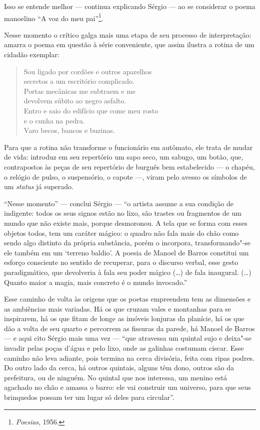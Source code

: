 Isso se entende melhor --- continua explicando Sérgio --- ao se considerar
o poema manoelino ``A voz do meu pai''\footnote{\emph{Poesias}, 1956.}.

Nesse momento o crítico galga mais uma etapa de seu processo de
interpretação: amarra o poema em questão à série conveniente, que assim
ilustra a rotina de um cidadão exemplar:

\begin{verse}
Sou ligado por cordões e outros aparelhos \\
secretos a um escritório complicado. \\[5pt]
Portas mecânicas me subtraem e me \\
devolvem súbito ao negro asfalto. \\[5pt]
Entro e saio do edifício que come meu rosto \\
e o cunha na pedra. \\[5pt]
Varo becos, bancos e buzinas.
\end{verse}

Para que a rotina não transforme o funcionário em autômato, ele trata de
mudar de vida: introduz em seu repertório um sapo seco, um sabugo, um
botão, que, contrapostos às peças de seu repertório de burguês bem
estabelecido --- o chapéu, o relógio de pulso, o suspensório, o capote
---, viram pelo avesso os símbolos de um \emph{status} já superado.

``Nesse momento'' --- conclui Sérgio --- ``o artista assume a sua condição
de indigente: todos os seus signos estão no lixo, são trastes ou
fragmentos de um mundo que não existe mais, porque desmoronou. A tela
que se forma com esses objetos todos, tem um caráter mágico: o quadro
não fala mais do chão como sendo algo distinto da própria substância,
porém o incorpora, transformando"-se ele também em um `terreno baldio'.
A poesia de Manoel de Barros constitui um esforço consciente no sentido
de recuperar, para o discurso verbal, esse gesto paradigmático, que
devolveria à fala seu poder mágico (\ldots{}) de fala inaugural. (\ldots{}) Quanto
maior a magia, mais concreto é o mundo invocado.''

Esse caminho de volta às origens que os poetas empreendem tem as
dimensões e as ambiências mais variadas. Há os que cruzam vales e
montanhas para se inspirarem, há os que fitam de longe as imóveis
lonjuras da planície, há os que dão a volta de seu quarto e percorrem as
fissuras da parede, há Manoel de Barros --- e aqui cito Sérgio mais uma
vez --- ``que atravessa um quintal sujo e deixa"-se invadir pelas poças
d'água e pelo lixo, onde as galinhas costumam ciscar. Esse caminho não
leva adiante, pois termina na cerca divisória, feita com ripas podres.
Do outro lado da cerca, há outros quintais, alguns têm dono, outros são
da prefeitura, ou de ninguém. No quintal que nos interessa, um menino
está agachado no chão e amassa o barro: ele vai construir um universo,
para que seus brinquedos possam ter um lugar só deles para circular''.

